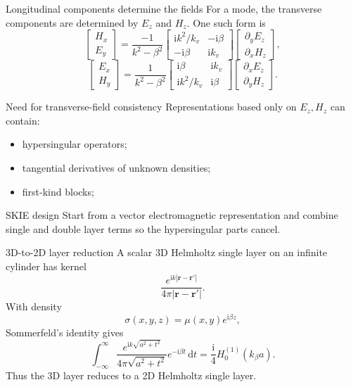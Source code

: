 \documentclass[aspectratio=169,10pt]{beamer}
\newcommand{\dd}{\,\mathrm d}
\newcommand{\ii}{\mathrm i}
\begin{document}
\begin{frame}{Longitudinal components determine the fields}
\small
For a mode, the transverse components are determined by $E_z$ and $H_z$.
One such form is
\[
\begin{bmatrix}H_x\\ E_y\end{bmatrix}
=
\frac{-1}{k^2-\beta^2}
\begin{bmatrix}
\ii k^2/k_v & -\ii\beta\\
-\ii\beta & \ii k_v
\end{bmatrix}
\begin{bmatrix}
\partial_y E_z\\ \partial_x H_z
\end{bmatrix},
\]
\[
\begin{bmatrix}E_x\\ H_y\end{bmatrix}
=
\frac{1}{k^2-\beta^2}
\begin{bmatrix}
\ii\beta & \ii k_v\\
\ii k^2/k_v & \ii\beta
\end{bmatrix}
\begin{bmatrix}
\partial_x E_z\\ \partial_y H_z
\end{bmatrix}.
\]
\end{frame}

\begin{frame}{Need for transverse-field consistency}
\small
Representations based only on $E_z,H_z$ can contain:
\begin{itemize}
  \item hypersingular operators;
  \item tangential derivatives of unknown densities;
  \item first-kind blocks;
\end{itemize}

\begin{block}{SKIE design}
Start from a vector electromagnetic representation and combine single and
double layer terms so the hypersingular parts cancel.
\end{block}
\end{frame}

\begin{frame}{3D-to-2D layer reduction}
\small
A scalar 3D Helmholtz single layer on an infinite cylinder has kernel
\[
  \frac{e^{\ii k|\bm r-\bm r'|}}{4\pi|\bm r-\bm r'|}.
\]
With density
\[
  \sigma(x,y,z)=\mu(x,y)e^{\ii\beta z},
\]
Sommerfeld's identity gives
\[
  \int_{-\infty}^{\infty}
  \frac{e^{\ii k\sqrt{a^2+t^2}}}{4\pi\sqrt{a^2+t^2}}
  e^{-\ii\beta t}\dd t
  =
  \frac{\ii}{4}H_0^{(1)}(k_\beta a).
\]
Thus the 3D layer reduces to a 2D Helmholtz single layer.
\end{frame}
\end{document}
